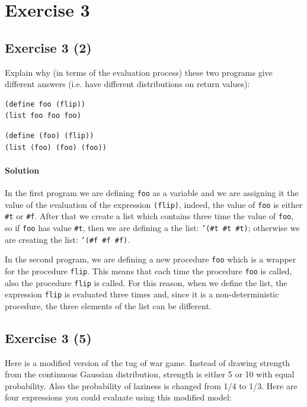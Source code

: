 \section*{Exercise 3}

\subsection*{Exercise 3 (2)}
Explain why (in terms of the evaluation process) these two programs give different answers 
(i.e. have different distributions on return values):
\begin{lstlisting}
(define foo (flip))
(list foo foo foo)
\end{lstlisting}

\begin{lstlisting}
(define (foo) (flip))
(list (foo) (foo) (foo))
\end{lstlisting}    

\paragraph{Solution} 
In the first program we are defining \texttt{foo} as a variable and we are assigning it the value of the evaluation of the 
expression \texttt{(flip)}, indeed, the value of \texttt{foo} is either \texttt{\#t} or \texttt{\#f}.
After that we create a list which contains three time the value of \texttt{foo}, so if \texttt{foo} has value \texttt{\#t}, then
we are defining a the list: \texttt{'(\#t \#t \#t)}; otherwise we are creating the list: \texttt{'(\#f \#f \#f)}.

In the second program, we are defining a new procedure \texttt{foo} which is a wrapper for the procedure \texttt{flip}. This means
that each time the procedure \texttt{foo} is called, also the procedure \texttt{flip} is called.
For this reason, when we define the list, the expression \texttt{flip} is evaluated three times and, since it is a non-deterministic 
procedure, the three elements of the list can be different.


\subsection*{Exercise 3 (5)}
Here is a modified version of the tug of war game. Instead of drawing strength from the continuous Gaussian 
distribution, strength is either 5 or 10 with equal probability. Also the probability of laziness is changed from 1/4 to 1/3. 
Here are four expressions you could evaluate using this modified model:

